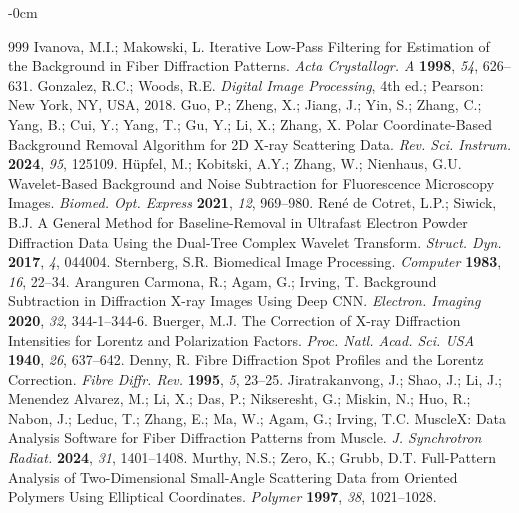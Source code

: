 \documentclass[journal,article,submit,moreauthors]{Definitions/mdpi}
\begin{document}
\begin{adjustwidth}{-\extralength}{0cm}
\begin{thebibliography}{999}
Ivanova, M.I.; Makowski, L. Iterative Low-Pass Filtering for Estimation of the Background in Fiber Diffraction Patterns. {\em Acta Crystallogr. A} {\bf 1998}, {\em 54}, 626--631.
Gonzalez, R.C.; Woods, R.E. \textit{Digital Image Processing}, 4th ed.; Pearson: New York, NY, USA, 2018.
Guo, P.; Zheng, X.; Jiang, J.; Yin, S.; Zhang, C.; Yang, B.; Cui, Y.; Yang, T.; Gu, Y.; Li, X.; Zhang, X. Polar Coordinate-Based Background Removal Algorithm for 2D X-ray Scattering Data. {\em Rev. Sci. Instrum.} {\bf 2024}, {\em 95}, 125109.
H\"upfel, M.; Kobitski, A.Y.; Zhang, W.; Nienhaus, G.U. Wavelet-Based Background and Noise Subtraction for Fluorescence Microscopy Images. {\em Biomed. Opt. Express} {\bf 2021}, {\em 12}, 969--980.
Ren\'e de Cotret, L.P.; Siwick, B.J. A General Method for Baseline-Removal in Ultrafast Electron Powder Diffraction Data Using the Dual-Tree Complex Wavelet Transform. {\em Struct. Dyn.} {\bf 2017}, {\em 4}, 044004.
Sternberg, S.R. Biomedical Image Processing. {\em Computer} {\bf 1983}, {\em 16}, 22--34.
Aranguren Carmona, R.; Agam, G.; Irving, T. Background Subtraction in Diffraction X-ray Images Using Deep CNN. {\em Electron. Imaging} {\bf 2020}, {\em 32}, 344-1--344-6.
Buerger, M.J. The Correction of X-ray Diffraction Intensities for Lorentz and Polarization Factors. {\em Proc. Natl. Acad. Sci. USA} {\bf 1940}, {\em 26}, 637--642.
Denny, R. Fibre Diffraction Spot Profiles and the Lorentz Correction. {\em Fibre Diffr. Rev.} {\bf 1995}, {\em 5}, 23--25.
Jiratrakanvong, J.; Shao, J.; Li, J.; Menendez Alvarez, M.; Li, X.; Das, P.; Nikseresht, G.; Miskin, N.; Huo, R.; Nabon, J.; Leduc, T.; Zhang, E.; Ma, W.; Agam, G.; Irving, T.C. MuscleX: Data Analysis Software for Fiber Diffraction Patterns from Muscle. {\em J. Synchrotron Radiat.} {\bf 2024}, {\em 31}, 1401--1408.
Murthy, N.S.; Zero, K.; Grubb, D.T. Full-Pattern Analysis of Two-Dimensional Small-Angle Scattering Data from Oriented Polymers Using Elliptical Coordinates. {\em Polymer} {\bf 1997}, {\em 38}, 1021--1028.
\end{thebibliography}





\end{adjustwidth}
\end{document}
